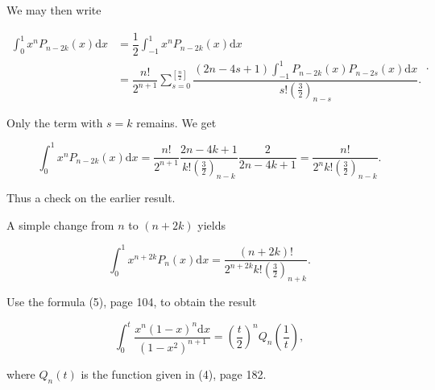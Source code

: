 \begin{solution}
We may then write

$$\begin{array}{ll}
\displaystyle\int_0^1 x^n P_{n-2k}(x) \mathrm{d}x &= \dfrac{1}{2} \displaystyle\int_{-1}^1 x^n P_{n-2k}(x) \mathrm{d}x \\
&= \dfrac{n!}{2^{n+1}} \displaystyle\sum_{s=0}^{[\frac{n}{2}]} \dfrac{(2n-4s+1) \int_{-1}^1 P_{n-2k}(x) P_{n-2s}(x) \mathrm{d}x}{s! (\frac{3}{2})_{n-s}}.
\end{array}.$$

Only the term with $s=k$ remains. We get

$$\displaystyle\int_0^1 x^n P_{n-2k}(x) \mathrm{d}x = \dfrac{n!}{2^{n+1}} \dfrac{2n-4k+1}{k! (\frac{3}{2})_{n-k}} \dfrac{2}{2n-4k+1} = \dfrac{n!}{2^n k! ( \frac{3}{2})_{n-k}}.$$

Thus a check on the earlier result.

A simple change from $n$ to $(n+2k)$ yields

$$\displaystyle\int_0^1 x^{n+2k} P_n(x) \mathrm{d}x = \dfrac{(n+2k)!}{2^{n+2k} k! (\frac{3}{2})_{n+k}}.$$
\end{solution}
\begin{problem}\label{problem13chapter10}
Use the formula (5), page 104, to obtain the result

$$\displaystyle\int_0^t \dfrac{x^n (1-x)^n \mathrm{d}x}{(1-x^2)^{n+1}} = \left( \dfrac{t}{2} \right)^n Q_n \left( \dfrac{1}{t} \right),$$

where $Q_n(t)$ is the function given in (4), page 182.
\end{problem}

